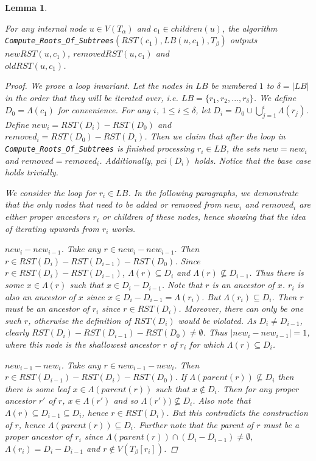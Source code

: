 \documentclass{article}
\newcommand{\leafset}{\Lambda}
\newtheorem{computerootsofsubtreescorrectness}[incompatibility]{Lemma}
\begin{document}
    \bigskip
    \begin{computerootsofsubtreescorrectness}
        \label{lem:computerootsofsubtreescorrectness}

        For any internal node $u \in V(T_\alpha)$ and $c_1 \in children(u)$, the algorithm\\ %
        \texttt{Compute\_Roots\_Of\_Subtrees}$(RST(c_1), LB(u, c_1), T_\beta)$ outputs $newRST(u, c_1)$, $removedRST(u, c_1)$ and\\ %
        $oldRST(u, c_1)$.

        \begin{proof}
            We prove a loop invariant. Let the nodes in $LB$ be numbered $1$ to $\delta = |LB|$ in the order that they will be iterated over, i.e. $LB = \{r_1, r_2, ..., r_{\delta}\}$. We define $D_0 = \leafset(c_1)$ for convenience. For any $i$, $1 \leq i \leq \delta$, let $D_i = D_0 \cup \bigcup_{j = 1}^{i} \leafset(r_j)$. Define $new_i = RST(D_i) - RST(D_0)$ and $removed_i = RST(D_0) - RST(D_i)$. Then we claim that after the loop in \texttt{Compute\_Roots\_Of\_Subtrees} is finished processing $r_i \in LB$, the sets $new = new_i$ and $removed = removed_i$. Additionally, $pci(D_i)$ holds. Notice that the base case holds trivially.

            We consider the loop for $r_i \in LB$. In the following paragraphs, we demonstrate that the only nodes that need to be added or removed from $new_i$ and $removed_i$ are either proper ancestors $r_i$ or children of these nodes, hence showing that the idea of iterating upwards from $r_i$ works.

            \textit{$new_i - new_{i-1}$.} Take any $r \in new_i - new_{i-1}$. Then $r \in RST(D_i) - RST(D_{i-1}) - RST(D_0)$. Since $r \in RST(D_i) - RST(D_{i-1})$, $\leafset(r) \subseteq D_i$ and $\leafset(r) \not\subseteq D_{i-1}$. Thus there is some $x \in \leafset(r)$ such that $x \in D_i - D_{i-1}$. Note that $r$ is an ancestor of $x$. $r_i$ is also an ancestor of $x$ since $x \in D_i - D_{i-1} = \leafset(r_i)$. But $\leafset(r_i) \subseteq D_i$. Then $r$ must be an ancestor of $r_i$ since $r \in RST(D_i)$. Moreover, there can only be one such $r$, otherwise the definition of $RST(D_i)$ would be violated. As $D_i \neq D_{i-1}$, clearly $RST(D_i) - RST(D_{i-1}) - RST(D_0) \neq \emptyset$. Thus $|new_i - new_{i-1}| = 1$, where this node is the shallowest ancestor $r$ of $r_i$ for which $\leafset(r) \subseteq D_i$.

            \textit{$new_{i-1} - new_i$.} Take any $r \in new_{i-1} - new_i$. Then $r \in RST(D_{i-1}) - RST(D_i) - RST(D_0)$. If $\leafset(parent(r)) \not\subseteq D_i$ then there is some leaf $x \in \leafset(parent(r))$ such that $x \not\in D_i$. Then for any proper ancestor $r'$ of $r$, $x \in \leafset(r')$ and so $\leafset(r')) \not\subseteq D_i$. Also note that $\leafset(r) \subseteq D_{i-1} \subseteq D_i$, hence $r \in RST(D_i)$. But this contradicts the construction of $r$, hence $\leafset(parent(r)) \subseteq D_i$. Further note that the parent of $r$ must be a proper ancestor of $r_i$ since $\leafset(parent(r)) \cap (D_i - D_{i-1}) \neq \emptyset$, $\leafset(r_i) = D_i - D_{i-1}$ and $r \not\in V(T_\beta[r_i])$.


\end{proof}
\end{computerootsofsubtreescorrectness}
\end{document}
